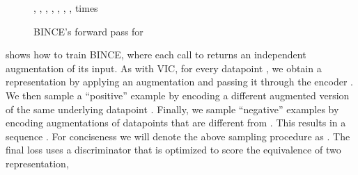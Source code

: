 \documentclass[final]{article}
\begin{document}
\begin{wrapfigure}{r}{0.45\textwidth}
\vspace{-2.1\baselineskip} \begin{minipage}{0.45\textwidth}
 \centering
\newcommand{\vspacing}{} \begin{algorithm}[H]
\small
\caption{BINCE's forward pass for }
\label{alg:BINCE}
    \begin{algorithmic}[1]
    \Require \vspacing ,  , , , , , ,  
\State \vspacing  {}
    \State \vspacing  
    \State \vspacing  
    \State \vspacing   times  
    \State \vspacing  
    \State \vspacing  
    \State \vspacing  
    \State \vspacing 
    \State \vspacing   \\
    \Return \vspacing 
\end{algorithmic}
\end{algorithm}
\end{minipage}
\vspace{-1.7\baselineskip}
\end{wrapfigure} 
 shows how to train BINCE, where each call to  returns an independent augmentation of its input.
As with VIC, for every datapoint , we obtain a representation  by applying an augmentation  and passing it through the encoder .
We then sample a ``positive'' example  by encoding a different augmented version of the same underlying datapoint .
Finally, we sample  ``negative'' examples  by encoding augmentations  of datapoints  that are different from .
This results in a sequence .
For conciseness we will denote the above sampling procedure as .
The final loss uses a discriminator  that is optimized to score the equivalence of two representation,
\end{document}

